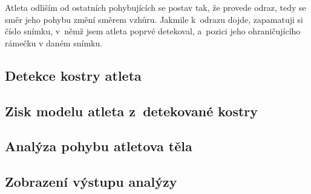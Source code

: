 Atleta odliším od ostatních pohybujících se postav tak, že provede odraz, tedy se směr jeho pohybu změní směrem vzhůru. Jakmile k~odrazu dojde, zapamatuji si číslo snímku, v~němž jsem atleta poprvé detekoval, a~pozici jeho ohraničujícího rámečku v daném snímku.

\subsection{Detekce kostry atleta}

\subsection{Zisk modelu atleta z~detekované kostry}

\subsection{Analýza pohybu atletova těla}

\subsection{Zobrazení výstupu analýzy}

















